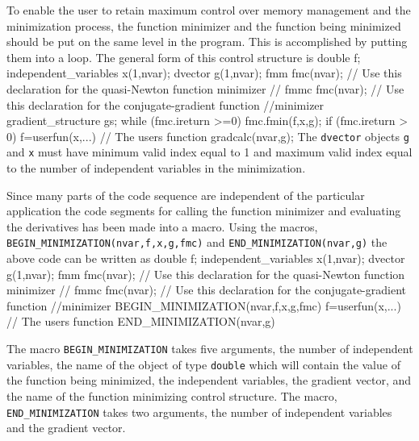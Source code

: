 \documentclass[12pt]{book}
\begin{document}
To enable the user to retain maximum control over memory management
and the minimization process,
the function minimizer and the 
function being minimized should be put on the same level in the program.
 This is accomplished
by putting them into a loop. The general form of this control
structure is  
\beginexample
double f;
independent_variables x(1,nvar);
dvector g(1,nvar);
fmm fmc(nvar);  // Use this declaration for the quasi-Newton function minimizer
// fmmc fmc(nvar);  // Use this declaration for the conjugate-gradient function 
                    //minimizer
gradient_structure gs;  
while (fmc.ireturn >=0)
{
  fmc.fmin(f,x,g);
  if (fmc.ireturn > 0)
  { 
    f=userfun(x,...) // The users function
    gradcalc(nvar,g);
  }
}
\endexample
The {\tt dvector} objects {\tt g} and {\tt x} must have
minimum valid index equal to 1 and maximum valid index equal to the
number of independent variables in the minimization.

Since many parts of the code sequence are independent of the 
particular application the code segments for calling the function minimizer and
evaluating the derivatives has been made into a macro. Using the
macros, {\tt BEGIN\_MINIMIZATION(nvar,f,x,g,fmc)} and 
{\tt END\_MINIMIZATION(nvar,g)} 
the above code can be written as
\beginexample
double f;
independent_variables x(1,nvar);
dvector g(1,nvar);
fmm fmc(nvar); // Use this declaration for the quasi-Newton function minimizer
// fmmc fmc(nvar);  // Use this declaration for the conjugate-gradient function 
                    //minimizer
BEGIN_MINIMIZATION(nvar,f,x,g,fmc) 
  f=userfun(x,...) // The users function
END_MINIMIZATION(nvar,g) 
\endexample

The macro {\tt BEGIN\_MINIMIZATION} takes five arguments, the number of
independent variables, the name of the object of type {\tt double}
which will contain the value of the function being minimized,
the independent variables, the gradient vector, and the name of 
the function minimizing control structure.
The macro, {\tt END\_MINIMIZATION} takes two arguments, the number of
independent variables and the gradient vector. 
\end{document}
